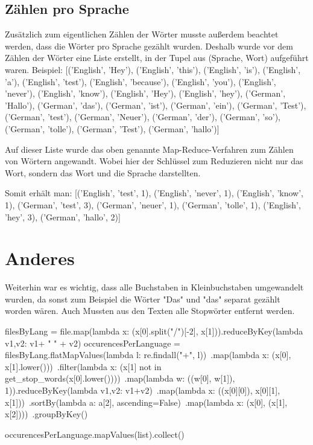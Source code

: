 \documentclass[chapterprefix=true, 12pt, a4paper, oneside, parskip=half, listof=totoc, bibliography=totoc, numbers=noendperiod]{scrbook}
\begin{document}
\subsection{Zählen pro Sprache}
Zusätzlich zum eigentlichen Zählen der Wörter musste außerdem beachtet werden, dass die Wörter pro Sprache gezählt wurden. Deshalb wurde vor dem Zählen der Wörter eine Liste erstellt, in der Tupel aus (Sprache, Wort) aufgeführt waren. 
Beispiel: [('English', 'Hey'),
 ('English', 'this'),
 ('English', 'is'),
 ('English', 'a'),
 ('English', 'test'),
 ('English', 'because'),
 ('English', 'you'),
 ('English', 'never'),
 ('English', 'know'),
 ('English', 'Hey'),
 ('English', 'hey'),
 ('German', 'Hallo'),
 ('German', 'das'),
 ('German', 'ist'),
 ('German', 'ein'),
 ('German', 'Test'),
 ('German', 'test'),
 ('German', 'Neuer'),
 ('German', 'der'),
 ('German', 'so'),
 ('German', 'tolle'),
 ('German', 'Test'),
 ('German', 'hallo')]

 Auf dieser Liste wurde das oben genannte Map-Reduce-Verfahren zum Zählen von Wörtern angewandt. Wobei hier der Schlüssel zum Reduzieren nicht nur das Wort, sondern das Wort und die Sprache darstellten. 
 
 Somit erhält man: 
 [('English', 'test', 1),
 ('English', 'never', 1),
 ('English', 'know', 1),
 ('German', 'test', 3),
 ('German', 'neuer', 1),
 ('German', 'tolle', 1),
 ('English', 'hey', 3),
 ('German', 'hallo', 2)]
 
\section{Anderes}

Weiterhin war es wichtig, dass alle Buchstaben in Kleinbuchstaben umgewandelt wurden, da sonst zum Beispiel die Wörter "Das" und "das" separat gezählt worden wären. Auch Mussten aus den Texten alle Stopwörter entfernt werden. 


filesByLang = file.map(lambda x: (x[0].split("/")[-2], x[1])).reduceByKey(lambda v1,v2: v1+ " " + v2)
occurencesPerLanguage = filesByLang.flatMapValues(lambda l: re.findall("\w+", l))\
        .map(lambda x: (x[0], x[1].lower()))\
        .filter(lambda x: (x[1] not in get_stop_words(x[0].lower())))\
        .map(lambda w: ((w[0], w[1]), 1)).reduceByKey(lambda v1,v2: v1+v2)\
        .map(lambda x: ((x[0][0]), x[0][1], x[1]))\
        .sortBy(lambda a: a[2], ascending=False)\
        .map(lambda x: (x[0], (x[1], x[2])))\
        .groupByKey()


occurencesPerLanguage.mapValues(list).collect()
\end{document}
